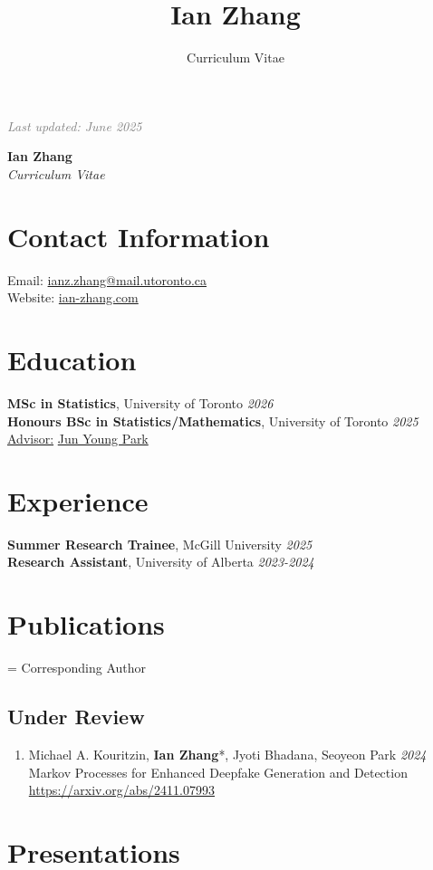 \documentclass[11pt]{article}
\title{Ian Zhang}
\author{Curriculum Vitae}
\theoremstyle{definition}
\newcommand{\1}{\mathds 1}
\begin{document}
\hfill {\scriptsize\textit{\textcolor{gray}{Last updated: June 2025}}}
\begin{center}
    {\huge \textbf{Ian Zhang}}\\
    \textit{Curriculum Vitae}
\end{center}

\section*{Contact Information}
Email: \href{mailto:ianz.zhang@mail.utoronto.ca}{ianz.zhang@mail.utoronto.ca}\\
Website: \href{www.ian-zhang.com}{ian-zhang.com}

\section*{Education}
\textbf{MSc in Statistics}, University of Toronto \hfill \textit{2026}\\
\textbf{Honours BSc in Statistics/Mathematics}, University of Toronto \hfill \textit{2025}\\
\underline{Advisor:} \href{https://junjypark.github.io/}{Jun Young Park}

\section*{Experience}
\textbf{Summer Research Trainee}, McGill University \hfill \textit{2025}\\
\textbf{Research Assistant}, University of Alberta \hfill \textit{2023-2024}

\section*{Publications}
{\small* = Corresponding Author}
\subsection*{Under Review}
\begin{enumerate}
    \item Michael A. Kouritzin, \textbf{Ian Zhang}*, Jyoti Bhadana, Seoyeon Park \hfill \textit{2024}\\
    Markov Processes for Enhanced Deepfake Generation and Detection \\
    \url{https://arxiv.org/abs/2411.07993}
\end{enumerate}

\section*{Presentations}
\end{document}

